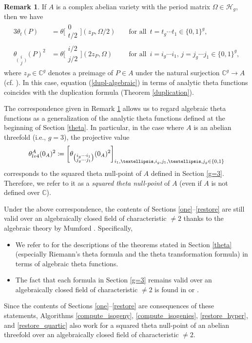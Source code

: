 \documentclass{amsart}
\theoremstyle{definition}
\newtheorem{Rmk}[Def]{Remark}
\theoremstyle{plain}
\begin{document}
\begin{Rmk}\label{algebraic-analytic}
If $A$ is a complex abelian variety with the period matrix $\varOmega \in \mathcal{H}_g$, then we have
\begin{alignat*}{3}
    \theta_t(P) &= \theta\bigl[\begin{smallmatrix}0\\t/2\end{smallmatrix}\bigr](z_P,\varOmega/2) &&\text{ for all }\, t=t_g \cdots t_1 \in \{0,1\}^g,\\
    \theta_{\bigl(\substack{i\\[0.1mm]j}\bigr)}(P)^2 &= \theta\bigl[\begin{smallmatrix}i/2\\j/2\end{smallmatrix}\bigr](2z_P,\varOmega) &&\text{ for all }\, i=i_g \cdots i_1,\,j = j_g \cdots j_1 \in \{0,1\}^g,
\end{alignat*}
where $z_P \in \mathbb{C}^g$ denotes a preimage of $P \in A$ under the natural surjection $\mathbb{C}^g \to A$ (cf. \cite[Chapter 4, Remark 5.3]{Robert}).
In this case, equation (\ref{dupl-algebraic}) in terms of analytic theta functions coincides with the duplication formula (Theorem \ref{duplication}).
\end{Rmk}
\noindent The correspondence given in Remark \ref{algebraic-analytic} allows us to regard algebraic theta functions as a generalization of the analytic theta functions defined at the beginning of Section \ref{theta}.
In particular, in the case where $A$ is an abelian threefold (i.e., $g=3$), the projective value
\[
    \theta^A_{\rm lv4}(0_A)^2 \coloneqq \biggl[\theta_{\bigl(\substack{i_g \cdots i_1\\[-0.5mm]j_g \cdots j_1}\bigr)}(0_A)^2\biggr]_{i_1,\ldots,i_g,j_1,\ldots,j_g \in \{0,1\}}\smallskip
\]
corresponds to the squared theta null-point of $A$ defined in Section \ref{g=3}.
Therefore, we refer to it as a \emph{squared theta null-point} of $A$ (even if $A$ is not defined over $\mathbb{C}$).\bigskip

Under the above correspondence, the contents of Sections \ref{one}--\ref{restore} are still valid over an algebraically closed field of characteristic $\neq 2$ thanks to the algebraic theory by Mumford \cite{Mumford}.
Specifically,\smallskip
\begin{itemize}
\item[---] We refer to \cite[$\S 2$]{Robert-mail} for the descriptions of the theorems stated in Section \ref{theta} (especially Riemann's theta formula and the theta transformation formula) in terms of algebraic theta functions.\medskip
\item[---] The fact that each formula in Section \ref{g=3} remains valid over an algebraically closed field of characteristic $\neq 2$ is found in \cite[p.\,31]{KNRR} or \cite[Remark 6.3]{Pieper}.\smallskip
\end{itemize}
Since the contents of Sections \ref{one}--\ref{restore} are consequences of these statements, Algorithms \ref{compute_isogeny}, \ref{compute_isogenies}, \ref{restore_hyper}, and \ref{restore_quartic} also work for a squared theta null-point of an abelian threefold over an algebraically closed field of characteristic $\neq 2$.
\end{document}
